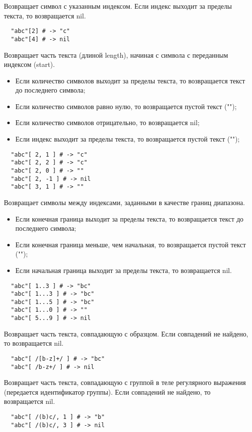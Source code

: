 \begin{methodlist}
  Возвращает символ с указанным индексом. Если индекс выходит за пределы текста, то возвращается nil.
  \begin{verbatim}
  "abc"[2] # -> "c"
  "abc"[4] # -> nil
  \end{verbatim}

  Возвращает часть текста (длиной length), начиная с символа с переданным индексом (start). 
  \begin{itemize}
    \item Если количество символов выходит за пределы текста, то возвращается текст до последнего символа;
    \item Если количество символов равно нулю, то возвращается пустой текст ("");
    \item Если количество символов отрицательно, то возвращается nil;
    \item Если индекс выходит за пределы текста, то возвращается пустой текст ("");
  \end{itemize}
  \begin{verbatim}
  "abc"[ 2, 1 ] # -> "c"
  "abc"[ 2, 2 ] # -> "c"
  "abc"[ 2, 0 ] # -> ""
  "abc"[ 2, -1 ] # -> nil
  "abc"[ 3, 1 ] # -> ""
  \end{verbatim}

  Возвращает символы между индексами, заданными в качестве границ диапазона. 
  \begin{itemize}
    \item Если конечная граница выходит за пределы текста, то возвращается текст до последнего символа;

    \item Если конечная граница меньше, чем начальная, то возвращается пустой текст ("");

    \item Если начальная граница выходит за пределы текста, то возвращается nil.
  \end{itemize}
  \begin{verbatim}
  "abc"[ 1..3 ] # -> "bc"
  "abc"[ 1...3 ] # -> "bc"
  "abc"[ 1...5 ] # -> "bc"
  "abc"[ 1...0 ] # -> ""
  "abc"[ 5...9 ] # -> nil
  \end{verbatim}

  Возвращает часть текста, совпадающую с образцом. Если совпадений не найдено, то возвращается nil.
  \begin{verbatim}
  "abc"[ /[b-z]+/ ] # -> "bc"
  "abc"[ /b-z+/ ] # -> nil
  \end{verbatim}

  Возвращает часть текста, совпадающую с группой в теле регулярного выражения (передается идентификатор группы). Если совпадений не найдено, то возвращается nil.
  \begin{verbatim}
  "abc"[ /(b)c/, 1 ] # -> "b"
  "abc"[ /(b)c/, 3 ] # -> nil
  \end{verbatim}
\end{methodlist}

